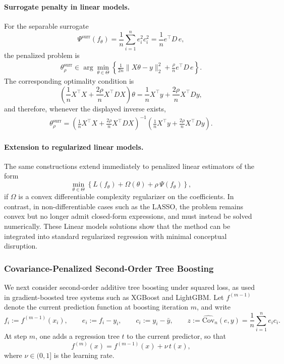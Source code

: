\documentclass[12pt, draft]{article}
\theoremstyle{plain}
\theoremstyle{definition}
\newcommand{\1}{\mathbf{1}}
\newcommand{\Cov}{\text{Cov}}
\begin{document}
\paragraph{Surrogate penalty in linear models.}
For the separable surrogate
\[
\Psi^{\mathrm{surr}}(f_\theta)
=
\frac{1}{n}\sum_{i=1}^n e_i^2 c_i^2
=
\frac{1}{n}e^\top D\,e,
\]
the penalized problem is
\begin{align}
    \label{opt:linear_surr}
    \theta_{\rho}^{\mathrm{surr}}
    \in
    \arg\min_{\theta\in\Theta}
    \left\{
        \frac{1}{2n}\|X\theta-y\|_2^2
        +
        \frac{\rho}{n}e^\top D\,e
    \right\}.
\end{align}
The corresponding optimality condition is
\[
\left(
\frac{1}{n}X^\top X
+
\frac{2\rho}{n}X^\top D X
\right)\theta
=
\frac{1}{n}X^\top y
+
\frac{2\rho}{n}X^\top D y,
\]
and therefore, whenever the displayed inverse exists,
\begin{align}
    \label{eq:linear_surr_closed_form}
    \theta_{\rho}^{\mathrm{surr}}
    =
    \left(
        \frac{1}{n}X^\top X
        +
        \frac{2\rho}{n}X^\top D X
    \right)^{-1}
    \left(
        \frac{1}{n}X^\top y
        +
        \frac{2\rho}{n}X^\top D y
    \right).
\end{align}

\paragraph{Extension to regularized linear models.}
The same constructions extend immediately to penalized linear estimators of the form
\[
\min_{\theta\in\Theta}
\left\{
    L(f_\theta) + \Omega(\theta) + \rho\,\Psi(f_\theta)
\right\},
\]
if \(\Omega\) is a convex differentiable complexity regularizer on the coefficients. In contrast, in non-differentiable cases such as the LASSO, the problem remains convex but no longer admit closed-form expressions, and must instead be solved numerically. These Linear models solutions show that the method can be integrated into standard regularized regression with minimal conceptual disruption.

\subsubsection{Covariance-Penalized Second-Order Tree Boosting}
\label{subsec:tree_boosting}

We next consider second-order additive tree boosting under squared loss, as used in gradient-boosted tree systems such as XGBoost and LightGBM. Let \(f^{(m-1)}\) denote the current prediction function at boosting iteration \(m\), and write
\[
f_i := f^{(m-1)}(x_i),
\qquad
e_i := f_i - y_i,
\qquad
c_i := y_i - \bar y,
\qquad
z := \widehat{\Cov}_n(e,y) = \frac{1}{n}\sum_{i=1}^n e_i c_i.
\]
At step \(m\), one adds a regression tree \(t\) to the current predictor, so that
\[
f^{(m)}(x) = f^{(m-1)}(x) + \nu\,t(x),
\]
where \(\nu\in(0,1]\) is the learning rate.
\end{document}
